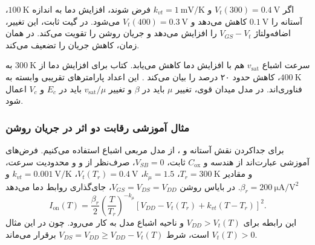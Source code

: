 اگر \(V_t(300)=\qty{0.4}{\volt}\) و
\(k_{vt}=\qty{1}{\milli\volt\per\kelvin}\) فرض شوند، افزایش دما
به اندازه \(\qty{100}{\kelvin}\)، آستانه را
\(\qty{0.1}{\volt}\) کاهش می‌دهد و
\(V_t(400)=\qty{0.3}{\volt}\) می‌شود. در گیت ثابت، این تغییر،
اضافه‌ولتاژ \(V_{GS}-V_t\) را افزایش می‌دهد و جریان روشن را تقویت
می‌کند. در همان زمان، کاهش  جریان را تضعیف می‌کند.

سرعت اشباع \(v_{\mathrm{sat}}\) هم با افزایش دما کاهش می‌یابد.
کتاب برای افزایش دما از \(\qty{300}{\kelvin}\) به
\(\qty{400}{\kelvin}\)، کاهش حدود ۲۰ درصد را بیان می‌کند
\cite[صفحه ۸۵]{weste}. این اعداد پارامترهای تقریبی وابسته به فناوری‌اند.
در مدل میدان قوی، تغییر \(\mu\) باید در \(\beta\) و تغییر
\(v_{\mathrm{sat}}/\mu\) باید در \(E_c\) و \(V_c\) اعمال شود.

\subsubsection*{مثال آموزشی رقابت دو اثر در جریان روشن}
برای جداکردن نقش آستانه و ، از مدل مربعی اشباع استفاده
می‌کنیم. فرض‌های آموزشی عبارت‌اند از هندسه و
\(C_{\mathrm{ox}}\) ثابت، \(V_{SB}=0\)، صرف‌نظر از  و
 و محدودیت سرعت، و مقادیر
\(T_r=\qty{300}{\kelvin}\)، \(k_\mu=1.5\)،
\(V_t(T_r)=\qty{0.4}{\volt}\)،
\(k_{vt}=\qty{0.001}{\volt\per\kelvin}\) و
\(\beta_r=\qty{200}{\micro\ampere\per\volt\squared}\).
در بایاس روشن \(V_{GS}=V_{DS}=V_{DD}\)، جای‌گذاری روابط دما می‌دهد
\begin{equation}
 I_{\mathrm{on}}(T)=\frac{\beta_r}{2}
 \left(\frac{T}{T_r}\right)^{-k_\mu}
 [V_{DD}-V_t(T_r)+k_{vt}(T-T_r)]^2.
 \label{eq:temperature-on-current}
\end{equation}
این رابطه برای \(V_{DD}>V_t(T)\) و ناحیه اشباع مدل به کار می‌رود.
چون در این مثال \(V_t(T)>0\) است، شرط
\(V_{DS}=V_{DD}\ge V_{DD}-V_t(T)\) برقرار می‌ماند.

